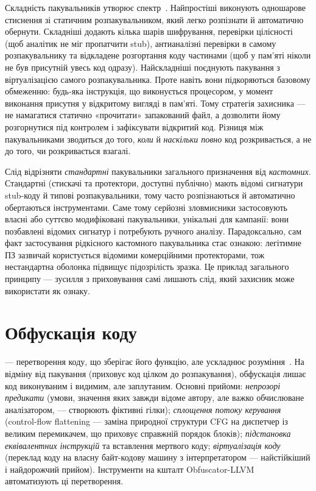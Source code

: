 Складність пакувальників утворює спектр~\cite{ch08:ugarte}. Найпростіші виконують одношарове стиснення зі статичним розпакувальником, який легко розпізнати й автоматично обернути. Складніші додають кілька шарів шифрування, перевірки цілісності (щоб аналітик не міг пропатчити stub), антианалізні перевірки в самому розпакувальнику та відкладене розгортання коду частинами (щоб у пам'яті ніколи не був присутній увесь код одразу). Найскладніші поєднують пакування з віртуалізацією самого розпакувальника. Проте навіть вони підкоряються базовому обмеженню: будь-яка інструкція, що виконується процесором, у момент виконання присутня у відкритому вигляді в пам'яті. Тому стратегія захисника --- не намагатися статично «прочитати» запакований файл, а дозволити йому розгорнутися під контролем і зафіксувати відкритий код. Різниця між пакувальниками зводиться до того, \emph{коли} й \emph{наскільки повно} код розкривається, а не до того, чи розкривається взагалі.

Слід відрізняти \emph{стандартні} пакувальники загального призначення від \emph{кастомних}. Стандартні (стискачі та протектори, доступні публічно) мають відомі сигнатури stub-коду й типові розпакувальники, тому часто розпізнаються й автоматично обертаються інструментами. Саме тому серйозні зловмисники застосовують власні або суттєво модифіковані пакувальники, унікальні для кампанії: вони позбавлені відомих сигнатур і потребують ручного аналізу. Парадоксально, сам факт застосування рідкісного кастомного пакувальника стає ознакою: легітимне ПЗ зазвичай користується відомими комерційними протекторами, тож нестандартна оболонка підвищує підозрілість зразка. Це приклад загального принципу --- зусилля з приховування самі лишають слід, який захисник може використати як ознаку.

\section{Обфускація коду}\label{sec:ch08-obfuscation}

 --- перетворення коду, що зберігає його функцію, але ускладнює розуміння~\cite{ch08:collberg}. На відміну від пакування (приховує код цілком до розпакування), обфускація лишає код виконуваним і видимим, але заплутаним. Основні прийоми: \emph{непрозорі предикати} (умови, значення яких завжди відоме автору, але важко обчислюване аналізатором, --- створюють фіктивні гілки); \emph{сплощення потоку керування} (control-flow flattening --- заміна природної структури CFG на диспетчер із великим перемикачем, що приховує справжній порядок блоків); \emph{підстановка еквівалентних інструкцій} та вставлення мертвого коду; \emph{віртуалізація коду} (переклад коду на власну байт-кодову машину з інтерпретатором --- найстійкіший і найдорожчий прийом). Інструменти на кшталт Obfuscator-LLVM~\cite{ch08:junod} автоматизують ці перетворення.

